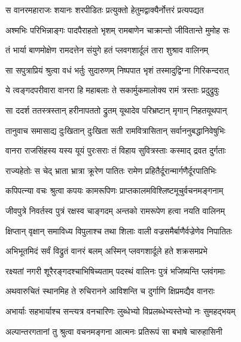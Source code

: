 
\twolineshloka
{स वानरमहाराजः शयानः शरपीडितः}
{प्रत्युक्तो हेतुमद्वाक्यैर्नोत्तरं प्रत्यपद्यत} %

\twolineshloka
{अश्मभिः परिभिन्नाङ्गः पादपैराहतो भृशम्}
{रामबाणेन चाक्रान्तो जीवितान्ते मुमोह सः} %

\twolineshloka
{तं भार्या बाणमोक्षेण रामदत्तेन संयुगे}
{हतं प्लवगशार्दूलं तारा शुश्राव वालिनम्} %

\twolineshloka
{सा सपुत्राप्रियं श्रुत्वा वधं भर्तुः सुदारुणम्}
{निष्पपात भृशं तस्मादुद्विग्ना गिरिकन्दरात्} %

\twolineshloka
{ये त्वङ्गदपरीवारा वानरा हि महाबलाः}
{ते सकार्मुकमालोक्य रामं त्रस्ताः प्रदुद्रुवुः} %

\twolineshloka
{सा ददर्श ततस्त्रस्तान् हरीनापततो द्रुतम्}
{यूथादेव परिभ्रष्टान् मृगान् निहतयूथपान्} %

\twolineshloka
{तानुवाच समासाद्य दुःखितान् दुःखिता सती}
{रामवित्रासितान् सर्वाननुबद्धानिवेषुभिः} %

\twolineshloka
{वानरा राजसिंहस्य यस्य यूयं पुरःसराः}
{तं विहाय सुवित्रस्ताः कस्माद् द्रवत दुर्गताः} %

\twolineshloka
{राज्यहेतोः स चेद् भ्राता भ्रात्रा क्रूरेण पातितः}
{रामेण प्रहितैर्दूरान्मार्गणैर्दूरपातिभिः} %

\twolineshloka
{कपिपत्न्या वचः श्रुत्वा कपयः कामरूपिणः}
{प्राप्तकालमविश्लिष्टमूचुर्वचनमङ्गनाम्} %

\twolineshloka
{जीवपुत्रे निवर्तस्व पुत्रं रक्षस्व चाङ्गदम्}
{अन्तको रामरूपेण हत्वा नयति वालिनम्} %

\twolineshloka
{क्षिप्तान् वृक्षान् समाविध्य विपुलाश्च तथा शिलाः}
{वाली वज्रसमैर्बाणैर्वज्रेणेव निपातितः} %

\twolineshloka
{अभिभूतमिदं सर्वं विद्रुतं वानरं बलम्}
{अस्मिन् प्लवगशार्दूले हते शक्रसमप्रभे} %

\twolineshloka
{रक्ष्यतां नगरी शूरैरङ्गदश्चाभिषिच्यताम्}
{पदस्थं वालिनः पुत्रं भजिष्यन्ति प्लवंगमाः} %

\twolineshloka
{अथवारुचितं स्थानमिह ते रुचिरानने}
{आविशन्ति च दुर्गाणि क्षिप्रमद्यैव वानराः} %

\twolineshloka
{अभार्याः सहभार्याश्च सन्त्यत्र वनचारिणः}
{लुब्धेभ्यो विप्रलब्धेभ्यस्तेभ्यो नः सुमहद्भयम्} %

\twolineshloka
{अल्पान्तरगतानां तु श्रुत्वा वचनमङ्गना}
{आत्मनः प्रतिरूपं सा बभाषे चारुहासिनी} %

